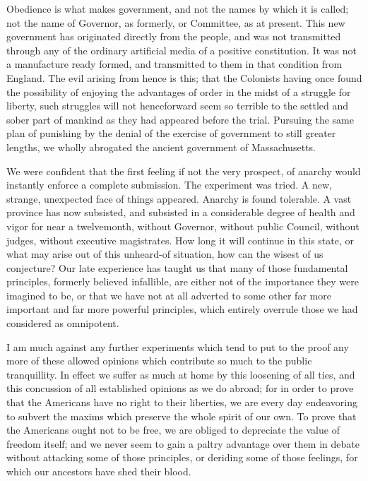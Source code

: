 Obedience is what makes government, and not the names by which it is called; not the name of Governor, as formerly, or Committee, as at present. This new government has originated directly from the people, and was not transmitted through any of the ordinary artificial media of a positive constitution. It was not a manufacture ready formed, and transmitted to them in that condition from England. The evil arising from hence is this; that the Colonists having once found the possibility of enjoying the advantages of order in the midst of a struggle for liberty, such struggles will not henceforward seem so terrible to the settled and sober part of mankind as they had appeared before the trial. Pursuing the same plan of punishing by the denial of the exercise of government to still greater lengths, we wholly abrogated the ancient government of Massachusetts.\par

We were confident that the first feeling if not the very prospect, of anarchy would instantly enforce a complete submission. The experiment was tried. A new, strange, unexpected face of things appeared. Anarchy is found tolerable. A vast province has now subsisted, and subsisted in a considerable degree of health and vigor for near a twelvemonth, without Governor, without public Council, without judges, without executive magistrates. How long it will continue in this state, or what may arise out of this unheard-of situation, how can the wisest of us conjecture? Our late experience has taught us that many of those fundamental principles, formerly believed infallible, are either not of the importance they were imagined to be, or that we have not at all adverted to some other far more important and far more powerful principles, which entirely overrule those we had considered as omnipotent.\par

I am much against any further experiments which tend to put to the proof any more of these allowed opinions which contribute so much to the public tranquillity. In effect we suffer as much at home by this loosening of all ties, and this concussion of all established opinions as we do abroad; for in order to prove that the Americans have no right to their liberties, we are every day endeavoring to subvert the maxims which preserve the whole spirit of our own. To prove that the Americans ought not to be free, we are obliged to depreciate the value of freedom itself; and we never seem to gain a paltry advantage over them in debate without attacking some of those principles, or deriding some of those feelings, for which our ancestors have shed their blood.\par

